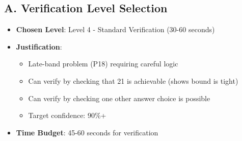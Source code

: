\documentclass[12pt]{article}
\begin{document}
\begin{verificationbox}
\subsection*{A. Verification Level Selection}
\begin{itemize}[leftmargin=*]
    \item \textbf{Chosen Level}: Level 4 - Standard Verification (30-60 seconds)
    \item \textbf{Justification}: 
    \begin{itemize}
        \item Late-band problem (P18) requiring careful logic
        \item Can verify by checking that 21 is achievable (shows bound is tight)
        \item Can verify by checking one other answer choice is possible
        \item Target confidence: 90\%+
    \end{itemize}
    \item \textbf{Time Budget}: 45-60 seconds for verification
\end{itemize}


\end{verificationbox}
\end{document}
